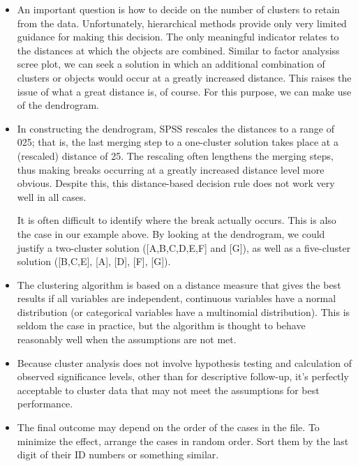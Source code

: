\documentclass[a4paper,12pt]{article}
\begin{document}
\begin{itemize}
\item An important question is how to decide on the number of
clusters to retain from the data. Unfortunately, hierarchical methods provide only
very limited guidance for making this decision. The only meaningful indicator
relates to the distances at which the objects are combined. Similar to factor
analysiss scree plot, we can seek a solution in which an additional combination
of clusters or objects would occur at a greatly increased distance. This raises the
issue of what a great distance is, of course. For this purpose, we can make use of the dendrogram.

\item In constructing the dendrogram, SPSS rescales the distances to a range of 025; that is, the last merging step to a one-cluster solution takes place at a
(rescaled) distance of 25. The rescaling often lengthens the merging steps, thus
making breaks occurring at a greatly increased distance level more obvious. Despite this, this distance-based decision rule does not work very well in all
cases.

It is often difficult to identify where the break actually occurs. This is also
the case in our example above. By looking at the dendrogram, we could justify
a two-cluster solution ([A,B,C,D,E,F] and [G]), as well as a five-cluster solution
([B,C,E], [A], [D], [F], [G]).


\item 
The clustering algorithm is based on a distance measure that gives the best results if all variables are independent, continuous variables have a normal distribution (or categorical variables have a multinomial distribution). This is seldom the case in practice, but the algorithm is thought to behave reasonably well when the assumptions are not met.

\item 
Because cluster analysis does not involve hypothesis testing and calculation of observed significance levels, other than for descriptive follow-up, it's perfectly acceptable to cluster data that may not meet the assumptions for best performance.
\item 
The final outcome may depend on the order of the cases in the file. To minimize the effect, arrange the cases in random order. Sort them by the last digit of their ID numbers or something similar.
\end{itemize}
\newpage


\end{document}
